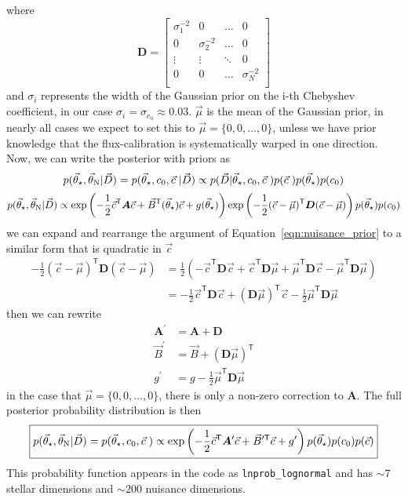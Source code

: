\documentclass[preprint]{aastex} %
\newcommand{\vt}{\vec{\theta}}
\newcommand{\vstar}{\vt_{\star}}
\newcommand{\vN}{\vt_{\rm N}}
\newcommand{\vc}{\vec{c}}
\newcommand{\vD}{\vec{D}}
\newcommand{\trans}{\mathsf{T}}
\begin{document}
where 
\begin{equation}
  {\bm D} = 
  \begin{bmatrix}
    \sigma_1^{-2} & 0 & \hdots & 0 \\
    0 & \sigma_2^{-2} & \hdots & 0 \\
    \vdots & \vdots & \ddots & 0 \\
    0 & 0 & \hdots & \sigma_N^{-2} \\
  \end{bmatrix}
\end{equation}
and $\sigma_i$ represents the width of the Gaussian prior on the i-th Chebyshev coefficient, in our case $\sigma_i = \sigma_{c_n} \approx 0.03$. $\vec{\mu}$ is the mean of the Gaussian prior, in nearly all cases we expect to set this to $\vec{\mu} = \{0, 0, \ldots, 0\}$, unless we have prior knowledge that the flux-calibration is systematically warped in one direction. Now, we can write the posterior with priors as
\begin{equation}
  p(\vstar, \vN | \vD) = p(\vstar, c_0, \vc\; | \vD) \propto p( \vD | \vstar, c_0, \vc\; ) p(\vc\;) p(\vstar) p(c_0) 
\end{equation}
\begin{equation}
  p(\vstar, \vN | \vD) \propto \exp \left ( - \frac{1}{2} \vc^\trans {\bm A} \vc + \vec{B}^\trans(\vstar) \vc + g(\vstar) \right )  \exp \left ( -\frac{1}{2} (\vc - \vec{\mu})^\trans {\bm D} (\vc - \vec{\mu}) \right ) p(\vstar) p(c_0)
  \label{eqn:posterior_prior}
\end{equation}
we can expand and rearrange the argument of Equation~\ref{eqn:nuisance_prior} to a similar form that is quadratic in $\vc$
\begin{align}
  -\frac{1}{2} (\vc - \vec{\mu})^\trans {\bm D} (\vc - \vec{\mu}) &= \frac{1}{2}\left ( -\vc^\trans {\bm D} \vc + \vc^\trans {\bm D} \vec{\mu} + \vec{\mu}^\trans {\bm D} \vc - \vec{\mu}^\trans {\bm D} \vec{\mu} \right )\\
  &= -\frac{1}{2} \vc^\trans {\bm D} \vc + ({\bm D} \vec{\mu})^\trans \vc - \frac{1}{2} \vec{\mu}^\trans {\bm D} \vec{\mu}
\end{align}
then we can rewrite
\begin{align}
  {\bm A}^\prime &= {\bm A} + {\bm D}\\
  \vec{B}^\prime &= \vec{B} + ({\bm D} \vec{\mu})^\trans\\
  g^\prime &= g - \frac{1}{2} \vec{\mu}^\trans {\bm D} \vec{\mu} 
\end{align}
in the case that $\vec{\mu} = \{0, 0, \ldots, 0\}$, there is only a non-zero correction to ${\bm A}$. The full posterior probability distribution is then
 \begin{equation}
   \boxed{
  p(\vstar, \vN | \vD) = p(\vstar, c_0, \vc\;) \propto \exp \left ( - \frac{1}{2} \vc^\trans {\bm A}^\prime \vc + \vec{B}^{\prime \trans} \vc + g^\prime \right ) p(\vstar) p(c_0) p(\vc)
}
\end{equation}
This probability function appears in the code as \texttt{lnprob\_lognormal} and has $\sim 7$ stellar dimensions and $\sim 200$ nuisance dimensions.
\end{document}

